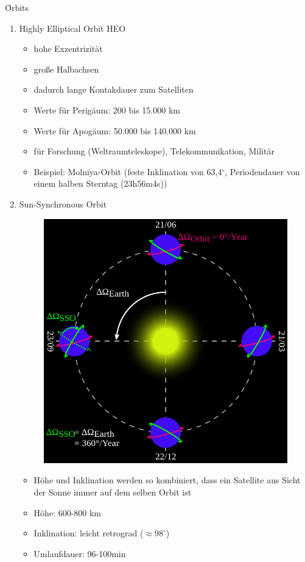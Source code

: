 \noindent \f{Orbits}
\begin{enumerate}
 \item Highly Elliptical Orbit HEO
 \begin{itemize}
  \item hohe Exzentrizität
  \item große Halbachsen
  \item dadurch lange Kontakdauer zum Satelliten
  \item Werte für Perigäum: 200 bis 15.000 km
  \item Werte für Apogäum: 50.000 bis 140.000 km
  \item für Forschung (\zb Weltraumteleskope), Telekommunikation, Militär 
  \item Beispiel: Molniya-Orbit (feste Inklination von 63,4$^\circ$, Periodendauer von einem halben Sterntag (23h56m4s))
 \end{itemize}
 \item Sun-Synchronous Orbit
 \begin{figure}[!ht]
  \centering
  \includegraphics[scale=0.4]{sso}
 \end{figure}
 \begin{itemize}
  \item Höhe und Inklination werden so kombiniert, dass ein Satellite aus Sicht der Sonne immer auf dem selben Orbit ist
  \item Höhe: 600-800 km
  \item Inklination: leicht retrograd ($\approx 98^\circ$)
  \item Umlaufdauer: 96-100min
 \end{itemize}


\end{enumerate}
